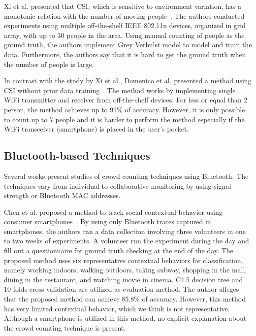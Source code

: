 	Xi et al. presented that \ac{CSI}, which is sensitive to environment variation, has a monotonic relation with the number of moving people~\cite{thesis006}. The authors conducted experiments using multiple off-the-shelf IEEE 802.11n devices, organized in grid array, with up to 30 people in the area. Using manual counting of people as the ground truth, the authors implement Grey Verhulst model to model and train the data. Furthermore, the authors say that it is hard to get the ground truth when the number of people is large.

	In contrast with the study by Xi et al., Domenico et al. presented a method using \ac{CSI} without prior data training~\cite{thesis051}. The method works by implementing single WiFi transmitter and receiver from off-the-shelf devices. For less or equal than 2 person, the method achieves up to 91\% of accuracy. However, it is only possible to count up to 7 people and it is harder to perform the method especially if the WiFi transceiver (smartphone) is placed in the user's pocket.
	

	

	



	


	

	

	

	










	\subsection{Bluetooth-based Techniques} %
	\label{sub:bluetooth-based-techniques}
	Several works present studies of crowd counting techniques using Bluetooth. The techniques vary from individual to collaborative monitoring by using signal strength or Bluetooth \ac{MAC} addresses. 

	Chen et al. proposed a method to track social contextual behavior using consumer smartphones~\cite{thesis028}. By using only Bluetooth traces captured in smartphones, the authors ran a data collection involving three volunteers in one to two weeks of experiments. A volunteer run the experiment during the day and fill out a questionnaire for ground truth checking at the end of the day. The proposed method uses six representative contextual behaviors for classification, namely working indoors, walking outdoors, taking subway, shopping in the mall, dining in the restaurant, and watching movie in cinema.
	C4.5 decision tree and 10-folds cross validation are utilized as evaluation method. The author alleges that the proposed method can achieve 85.8\% of accuracy. However, this method has very limited contextual behavior, which we think is not representative. Although a smartphone is utilized in this method, no explicit explanation about the crowd counting technique is present.

